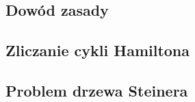 \subsection{Dowód zasady}


\subsection{Zliczanie cykli Hamiltona}


\subsection{Problem drzewa Steinera}
